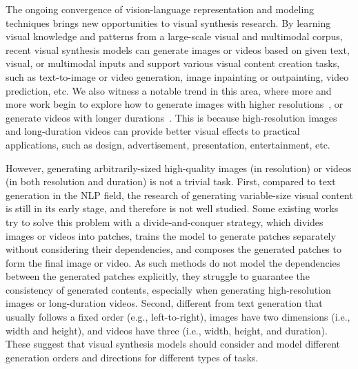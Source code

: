 \documentclass{article}
\begin{document}
The ongoing convergence of vision-language representation and modeling techniques brings new opportunities to visual synthesis research. By learning visual knowledge and patterns from a large-scale visual and multimodal corpus, recent visual synthesis models can generate images or videos based on given text, visual, or multimodal inputs and support various visual content creation tasks, such as text-to-image or video generation, image inpainting or outpainting, video prediction, etc. We also witness a notable trend in this area, where more and more work begin to explore how to generate images with higher resolutions~\cite{dingCogViewMasteringTexttoImage2021,rameshHierarchicalTextConditionalImage2022,skorokhodovAligningLatentImage2021,linInfinityGANInfinitePixelImage2022,changMaskGITMaskedGenerative2022}, or generate videos with longer durations~\cite{villegasHighFidelityVideo2019,clarkAdversarialVideoGeneration2019,liuInfiniteNaturePerpetual2021}. This is because high-resolution images and long-duration videos can provide 
better visual effects to practical applications, such as design, advertisement, presentation, entertainment, etc.

However, generating arbitrarily-sized high-quality images (in resolution) or videos (in both resolution and duration) is not a trivial task. First, compared to text generation in the NLP field, the research of generating variable-size visual content is still in its early stage, and therefore is not well studied. Some existing works~\cite{struskiLocoGANLocallyConvolutional2022,skorokhodovAligningLatentImage2021,esserTamingTransformersHighResolution2021,changMaskGITMaskedGenerative2022} try to solve this problem with a divide-and-conquer strategy, which divides images or videos into patches, trains the model to generate patches separately without considering their dependencies, and composes the generated patches to form the final image or video. As such methods do not model the dependencies between the generated patches explicitly, they struggle to guarantee the consistency of generated contents, especially when generating high-resolution images or long-duration videos. 
Second, different from text generation that usually follows a fixed order (e.g., left-to-right), images have two dimensions (i.e., width and height), and videos have three (i.e., width, height, and duration). These suggest that visual synthesis models should consider and model different generation orders and directions for different types of tasks.
\end{document}
